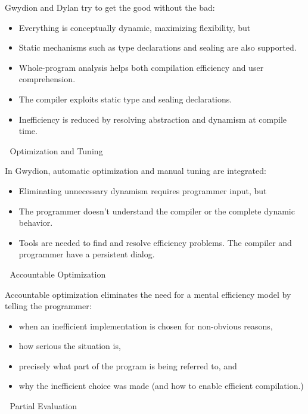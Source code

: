 \vspace{1em}
Gwydion and Dylan try to get the good without the bad:
\begin{itemize}
\item Everything is conceptually dynamic, maximizing flexibility, but
\item Static mechanisms such as type declarations and sealing are also
supported.

\item Whole-program analysis helps both compilation efficiency and user
comprehension.

\item The compiler exploits static type and sealing declarations.

\item Inefficiency is reduced by resolving abstraction and dynamism at compile
time.
\end{itemize}


\newpage
Optimization and Tuning

In Gwydion, automatic optimization and manual tuning are integrated:
\begin{itemize}
\item Eliminating unnecessary dynamism requires programmer input, but
\item The programmer doesn't understand the compiler or the complete dynamic
behavior.
\item Tools are needed to find and resolve efficiency problems.  The compiler
and programmer have a persistent dialog.
\end{itemize}


\newpage
Accountable Optimization

Accountable optimization eliminates the need for a mental efficiency model by
telling the programmer:
\begin{itemize}
\item when an inefficient implementation is chosen for non-obvious reasons,

\item how serious the situation is,

\item precisely what part of the program is being referred to, and

\item why the inefficient choice was made (and how to enable efficient
compilation.)
\end{itemize}


\newpage
Partial Evaluation

